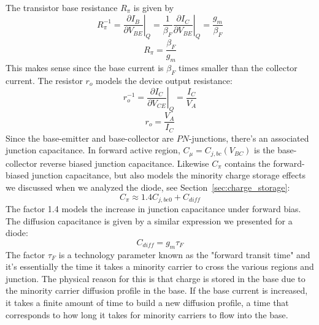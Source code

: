 The transistor base resistance $R_\pi$ is given by
    \begin{equation}
        R_\pi^{-1} = \left. \frac{\partial I_B}{\partial V_{BE}} \right|_Q = \frac{1}{\beta_F} \left. \frac{\partial I_C}{\partial V_{BE}}  \right|_Q = \frac{g_m}{\beta_F}
    \end{equation}
    \begin{equation}
        R_\pi = \frac{\beta_F}{g_m}
    \end{equation}
This makes sense since the base current is $\beta_F$ times smaller than the collector current.  The resistor $r_o$ models the device output resistance: 
    \begin{equation}
        r_o^{-1} = \left. \frac{\partial I_C}{\partial V_{CE}} \right|_Q  = \frac{I_C}{V_A}
    \end{equation}
    \begin{equation}
        r_o = \frac{V_A}{I_C}
    \end{equation}
Since the base-emitter and base-collector are $PN$-junctions, there's an associated junction capacitance.  In forward active region, $C_{\mu} = C_{j,bc}(V_{BC})$ is the base-collector reverse biased junction capacitance.  Likewise $C_\pi$ contains the forward-biased junction capacitance, but also models the minority charge storage effects we discussed when we analyzed the diode, see Section~\ref{sec:charge_storage}:
    \begin{equation}
        C_\pi \approx 1.4 C_{j,be0} + C_{diff}
    \end{equation}
The factor 1.4 models the increase in junction capacitance under forward bias.  The diffusion capacitance is given by a similar expression we presented for a diode:
    \begin{equation}
        C_{diff} = g_m \tau_F 
    \end{equation}
The factor $\tau_F$ is a technology parameter known as the "forward transit time" and it's essentially the time it takes a minority carrier to cross the various regions and junction.  The physical reason for this is that charge is stored in the base due to the minority carrier diffusion profile in the base.  If the base current is increased, it takes a finite amount of time to build a new diffusion profile, a time that corresponds to how long it takes for minority carriers to flow into the base.
